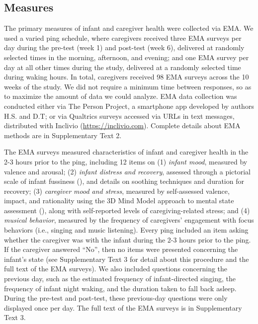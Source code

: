 \documentclass[
]{article}
\begin{document}
\subsection{Measures}\label{measures}

The primary measures of infant and caregiver health were collected via
EMA. We used a varied ping schedule, where caregivers received three EMA
surveys per day during the pre-test (week 1) and post-test (week 6),
delivered at randomly selected times in the morning, afternoon, and
evening; and one EMA survey per day at all other times during the study,
delivered at a randomly selected time during waking hours. In total,
caregivers received 98 EMA surveys across the 10 weeks of the study. We
did not require a minimum time between responses, so as to maximize the
amount of data we could analyze. EMA data collection was conducted
either via The Person Project, a smartphone app developed by authors
H.S. and D.T; or via Qualtrics surveys accessed via URLs in text
messages, distributed with Inclivio (\url{https://inclivio.com}).
Complete details about EMA methods are in Supplementary Text 2.

The EMA surveys measured characteristics of infant and caregiver health
in the 2-3 hours prior to the ping, including 12 items on (1)
\emph{infant mood}, measured by valence and arousal; (2) \emph{infant
distress and recovery}, assessed through a pictorial scale of infant
fussiness (), and details on
soothing techniques and duration for recovery; (3) \emph{caregiver mood
and stress}, measured by self-assessed valence, impact, and rationality
using the 3D Mind Model approach to mental state assessment
(), along with
self-reported levels of caregiving-related stress; and (4) \emph{musical
behavior}, measured by the frequency of caregivers' engagement with
focus behaviors (i.e., singing and music listening). Every ping included
an item asking whether the caregiver was with the infant during the 2-3
hours prior to the ping. If the caregiver answered ``No'', then no items
were presented concerning the infant's state (see Supplementary Text 3
for detail about this procedure and the full text of the EMA surveys).
We also included questions concerning the previous day, such as the
estimated frequency of infant-directed singing, the frequency of infant
night waking, and the duration taken to fall back asleep. During the
pre-test and post-test, these previous-day questions were only displayed
once per day. The full text of the EMA surveys is in Supplementary Text
3.
\end{document}
